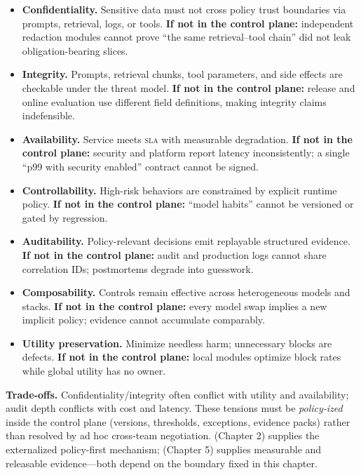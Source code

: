 \documentclass[11pt,a4paper]{report}
\begin{document}
\begin{securityobjectives}
\begin{itemize}
  \item \textbf{Confidentiality.} Sensitive data must not cross policy trust boundaries via prompts, retrieval, logs, or tools. \textbf{If not in the control plane:} independent redaction modules cannot prove “the same retrieval–tool chain” did not leak obligation-bearing slices.
  \item \textbf{Integrity.} Prompts, retrieval chunks, tool parameters, and side effects are checkable under the threat model. \textbf{If not in the control plane:} release and online evaluation use different field definitions, making integrity claims indefensible.
  \item \textbf{Availability.} Service meets \textsc{sla} with measurable degradation. \textbf{If not in the control plane:} security and platform report latency inconsistently; a single “p99 with security enabled” contract cannot be signed.
  \item \textbf{Controllability.} High-risk behaviors are constrained by explicit runtime policy. \textbf{If not in the control plane:} “model habits” cannot be versioned or gated by regression.
  \item \textbf{Auditability.} Policy-relevant decisions emit replayable structured evidence. \textbf{If not in the control plane:} audit and production logs cannot share correlation IDs; postmortems degrade into guesswork.
  \item \textbf{Composability.} Controls remain effective across heterogeneous models and stacks. \textbf{If not in the control plane:} every model swap implies a new implicit policy; evidence cannot accumulate comparably.
  \item \textbf{Utility preservation.} Minimize needless harm; unnecessary blocks are defects. \textbf{If not in the control plane:} local modules optimize block rates while global utility has no owner.
\end{itemize}
\end{securityobjectives}

\noindent\textbf{Trade-offs.} Confidentiality/integrity often conflict with utility and availability; audit depth conflicts with cost and latency. These tensions must be \emph{policy-ized} inside the control plane (versions, thresholds, exceptions, evidence packs) rather than resolved by ad hoc cross-team negotiation. \DecoupledSafety{} (Chapter 2) supplies the externalized policy-first mechanism; \EvalFramework{} (Chapter 5) supplies measurable and releasable evidence—both depend on the boundary fixed in this chapter.
\end{document}
